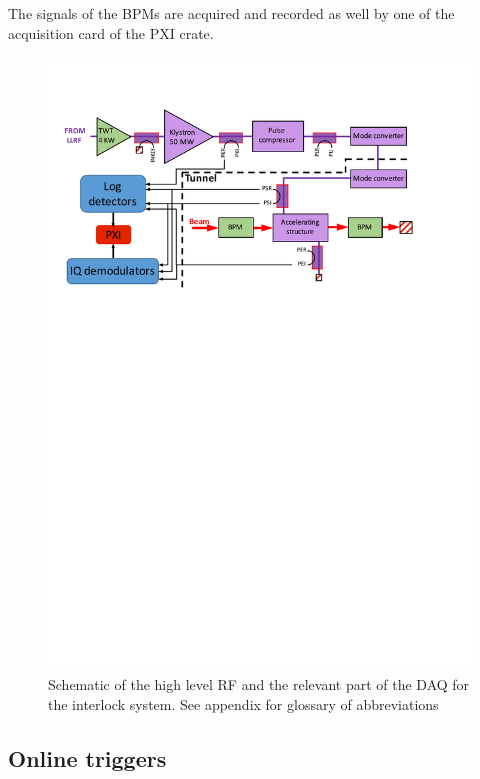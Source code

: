 The signals of the BPMs are acquired and recorded as well by one of the acquisition card of the PXI crate.





\begin{figure}[h]
\centering 
\includegraphics[scale=0.8]{pictures/high-level-RF-scheme.pdf}
\caption{Schematic of the high level RF and the relevant part of the DAQ for the interlock system. See appendix for glossary of abbreviations}
\label{high_l_RF}
\end{figure}



\subsection[Online triggers]{Online triggers}

